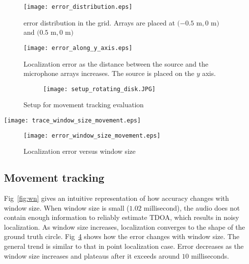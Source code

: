 \begin{figure}[]
\centering
\texttt{[image: error\_distribution.eps]}
\caption{error distribution in the grid. Arrays are placed at $(-0.5$ m$, 0$ m$)$ and $(0.5$ m$, 0$ m$)$}
\label{fig:error_distribution}
\end{figure}

\begin{figure}[]
\centering
\texttt{[image: error\_along\_y\_axis.eps]}
\caption{Localization error as the distance between the source and the microphone arrays increases. The source is placed on the $y$ axis.}
\label{fig:error_along_y}
\end{figure}


\begin{figure}[]
  \centering
  \begin{subfigure}[]{.5\textwidth}
    \texttt{[image: setup\_rotating\_disk.JPG]}
  \end{subfigure}
  \caption{Setup for movement tracking evaluation}
  \label{fig:setup_circle}
\end{figure}


\begin{figure*}[]
\centering
  \texttt{[image: trace\_window\_size\_movement.eps]}
\caption{Localization quality versus window size}\label{fig:wn}
\label{fig:trace_win_circle}
\end{figure*}

\begin{figure}[]
\centering
\texttt{[image: error\_window\_size\_movement.eps]}
\caption{Localization error versus window size}
\label{fig:err_win_circle}
\end{figure}


\subsection{Movement tracking}

Fig~\ref{fig:wn} gives an intuitive representation of how accuracy changes with window size. When window size is small ($1.02$ millisecond), the audio does not contain enough information to reliably estimate TDOA, which results in noisy localization. As window size increases, localization converges to the shape of the ground truth circle. Fig~\ref{fig:err_win_circle} shows how the error changes with window size. The general trend is similar to that in point localization case. Error decreases as the window size increases and plateaus after it exceeds around $10$ milliseconds.

